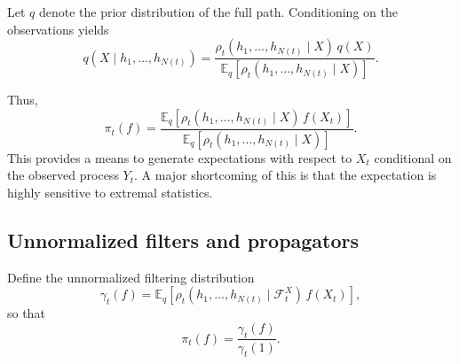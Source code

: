 \documentclass[11pt]{article}
\begin{document}
Let $q$ denote the prior distribution of the full path.  
Conditioning on the observations yields
\begin{equation}
q(X\mid h_1,\dots,h_{N(t)})
=
\frac{
\rho_t(h_1,\dots,h_{N(t)}\mid X)\,q(X)
}{
\mathbb E_q\!\left[\rho_t(h_1,\dots,h_{N(t)}\mid X)\right]
}.
\end{equation}

Thus,
\begin{equation}
\pi_t(f)
=
\frac{
\mathbb E_q\!\left[\rho_t(h_1,\dots,h_{N(t)}\mid X)\,f(X_t)\right]
}{
\mathbb E_q\!\left[\rho_t(h_1,\dots,h_{N(t)}\mid X)\right]
}.
\end{equation}
This provides a means to generate expectations with respect to $X_t$ conditional on the observed process $Y_t$. A major shortcoming of this is that the expectation is highly sensitive to extremal statistics. 

\subsection*{Unnormalized filters and propagators}

Define the unnormalized filtering distribution
\begin{equation}
\gamma_t(f)
=
\mathbb E_q\!\left[\rho_t(h_1,\dots,h_{N(t)}\mid {\mathcal F}_t^X)\,f(X_t)\right],
\end{equation}
so that
\[
\pi_t(f)=\frac{\gamma_t(f)}{\gamma_t(1)}.
\]
\end{document}
